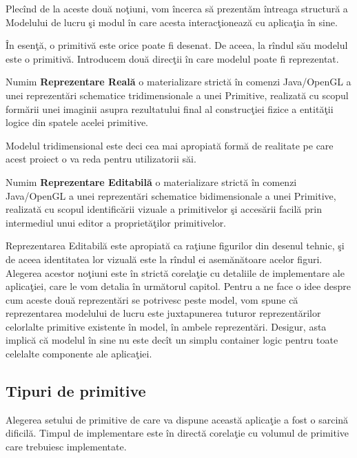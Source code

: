 Plecînd de la aceste două noţiuni, vom încerca să prezentăm întreaga structură 
a Modelului de lucru şi modul în care acesta interacţionează cu aplicaţia în 
sine.

În esenţă, o primitivă este orice poate fi desenat. De aceea, la rîndul său 
modelul este o primitivă. Introducem două direcţii în care modelul poate fi 
reprezentat.

\begin{definition}
Numim \textbf{Reprezentare Reală} o materializare strictă în comenzi 
Java/OpenGL a unei reprezentări schematice tridimensionale a unei Primitive, 
realizată cu scopul formării unei imaginii asupra rezultatului final al 
construcţiei fizice a entităţii logice din spatele acelei 
primitive.
\end{definition} Modelul tridimensional este deci cea mai apropiată 
formă de realitate pe care acest proiect o va reda pentru utilizatorii săi.

\begin{definition}
\label{define:editorRender}
Numim \textbf{Reprezentare Editabilă} o materializare strictă în comenzi 
Java/OpenGL a unei reprezentări schematice bidimensionale a unei Primitive, 
realizată cu scopul identificării vizuale a primitivelor şi accesării facilă 
prin intermediul unui editor a proprietăţilor primitivelor.
\end{definition}

Reprezentarea Editabilă este apropiată ca raţiune figurilor din desenul tehnic, 
şi de aceea identitatea lor vizuală este la rîndul ei asemănătoare acelor 
figuri. Alegerea acestor noţiuni este în strictă corelaţie cu detaliile de 
implementare ale aplicaţiei, care le vom detalia în următorul capitol. Pentru a 
ne face o idee despre cum aceste două reprezentări se potrivesc peste model, 
vom spune că reprezentarea modelului de lucru este juxtapunerea tuturor 
reprezentărilor celorlalte primitive existente în model, în ambele 
reprezentări. Desigur, asta implică că modelul în sine nu este decît un simplu 
container logic pentru toate celelalte componente ale aplicaţiei.

\subsection{Tipuri de primitive}

Alegerea setului de primitive de care va dispune această aplicaţie a fost o 
sarcină dificilă. Timpul de implementare este în directă corelaţie cu volumul 
de primitive care trebuiesc implementate.

